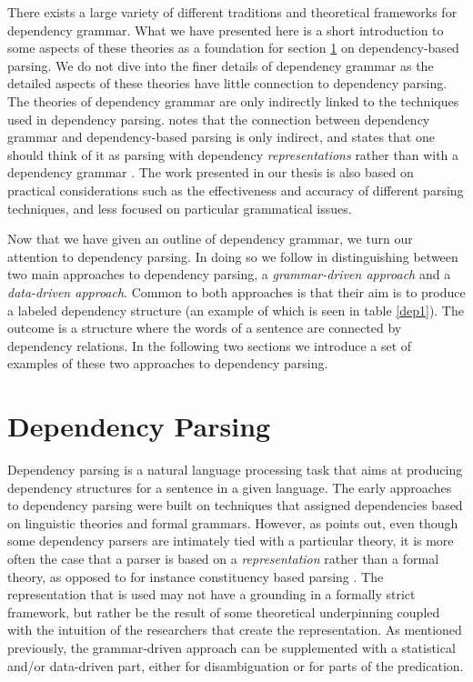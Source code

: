 There exists a large variety of different traditions and theoretical frameworks for dependency grammar. What we have presented here is a short introduction to some aspects of these theories as a foundation for section \ref{parsing} on dependency-based parsing. We do not dive into the finer details of dependency grammar as the detailed aspects of these theories have little connection to dependency parsing. The theories of dependency grammar are only indirectly linked to the techniques used in dependency parsing. \citeauthor{Niv:05} notes that the connection between dependency grammar and dependency-based parsing is only indirect, and states that one should think of it as parsing with dependency \textit{representations} rather than with a dependency grammar \cite{Niv:05}. The work presented in our thesis is also based on practical considerations such as the effectiveness and accuracy of different parsing techniques, and less focused on particular grammatical issues.

Now that we have given an outline of dependency grammar, we turn our attention to dependency parsing. In doing so we follow  in distinguishing between two main approaches to dependency parsing, a \textit{grammar-driven approach} and a \textit{data-driven approach}. Common to both approaches is that their aim is to produce a labeled dependency structure (an example of which is seen in table \ref{dep1}). The outcome is a structure where the words of a sentence are connected by dependency relations. In the following two sections we introduce a set of examples of these two approaches to dependency parsing.

\section{Dependency Parsing}
\label{parsing}

Dependency parsing is a natural language processing task that aims at producing dependency structures for a sentence in a given language. The early approaches to dependency parsing were built on techniques that assigned dependencies based on linguistic theories and formal grammars. However, as \citeauthor{Niv:05} points out, even though some dependency parsers are intimately tied with a particular theory, it is more often the case that a parser is based on a \textit{representation} rather than a formal theory, as opposed to for instance constituency based parsing \cite{Niv:05}. The representation that is used may not have a grounding in a formally strict framework, but rather be the result of some theoretical underpinning coupled with the intuition of the researchers that create the representation. As mentioned previously, the grammar-driven approach can be supplemented with a statistical and/or data-driven part, either for disambiguation or for parts of the predication.

